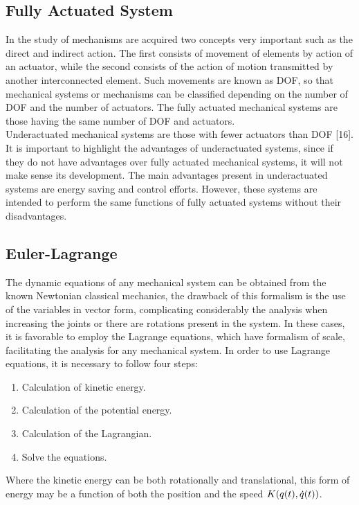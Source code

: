 \documentclass{UoNMCHA}
\numberwithin{equation}{section}
\begin{document}
\subsection{Fully Actuated System}
In the study of mechanisms are acquired two concepts very important such as the direct and indirect
action. The first consists of movement of elements by action of an actuator, while the second consists
of the action of motion transmitted by another interconnected element. Such movements are known as
DOF, so that mechanical systems or mechanisms can be classified depending on the number of DOF
and the number of actuators. The fully actuated mechanical systems are those having the same number of DOF and actuators.\\
Underactuated mechanical systems are those with fewer actuators than DOF [16].
It is important to highlight the advantages of underactuated systems, since if they do not have advantages
over fully actuated mechanical systems, it will not make sense its development. The main advantages
present in underactuated systems are energy saving and control efforts. However, these systems are
intended to perform the same functions of fully actuated systems without their disadvantages. 
%
\subsection{Euler-Lagrange}
The dynamic equations of any mechanical system can be obtained from the known Newtonian classical
mechanics, the drawback of this formalism is the use of the variables in vector form, complicating
considerably the analysis when increasing the joints or there are rotations present in the system. In these cases, it is favorable to employ the Lagrange equations, which have formalism of scale, facilitating the
analysis for any mechanical system.
In order to use Lagrange equations, it is necessary to follow four steps:
\begin{enumerate}
	
	\item Calculation of kinetic energy.
	\item Calculation of the potential energy.
	\item Calculation of the Lagrangian.
	\item Solve the equations.
\end{enumerate}

Where the kinetic energy can be both rotationally and translational, this form of energy may be a
function of both the position and the speed  $\boldmath{K(q(t),\dot{q}(t))}$.
\end{document}
